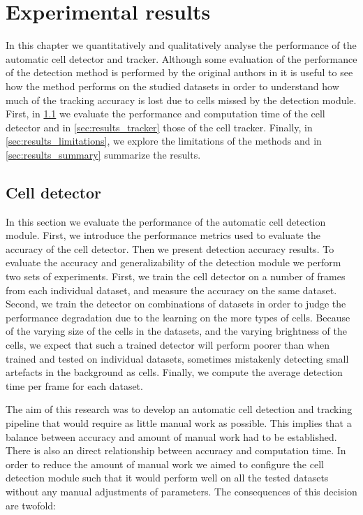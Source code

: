 \chapter{Experimental results }
\label{chap:results}

In this chapter we quantitatively and qualitatively analyse the performance of the automatic cell detector and tracker. Although some evaluation of the performance of the detection method is performed by the original authors in \cite{arteta12} it is useful to see how the method performs on the studied datasets in order to understand how much of the tracking accuracy is lost due to cells missed by the detection module. First, in \cref{sec:results_detector} we evaluate the performance and computation time of the cell detector and in \cref{sec:results_tracker} those of the cell tracker. Finally, in \cref{sec:results_limitations}, we explore the limitations of the methods and in \cref{sec:results_summary} summarize the results.


\section{Cell detector \statusfirstdraft}
	\label{sec:results_detector}
	
	In this section we evaluate the performance of the automatic cell detection module. First, we introduce the performance metrics used to evaluate the accuracy of the cell detector. Then we present detection accuracy results. To evaluate the accuracy and generalizability of the detection module we perform two sets of experiments. First, we train the cell detector on a number of frames from each individual dataset, and measure the accuracy on the same dataset. Second, we train the detector on combinations of datasets in order to judge the performance degradation due to the learning on the more types of cells. Because of the varying size of the cells in the datasets, and the varying brightness of the cells, we expect that such a trained detector will perform poorer than when trained and tested on individual datasets, sometimes mistakenly detecting small artefacts in the background as cells. Finally, we compute the average detection time per frame for each dataset.
	
	The aim of this research was to develop an automatic cell detection and tracking pipeline that would require as little manual work as possible. This implies that a balance between accuracy and amount of manual work had to be established. There is also an direct relationship between accuracy and computation time. In order to reduce the amount of manual work we aimed to configure the cell detection module such that it would perform well on all the tested datasets without any manual adjustments of parameters. The consequences of this decision are twofold:
	

